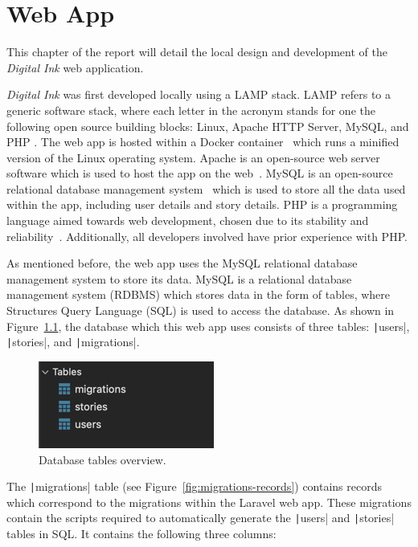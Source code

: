 \chapter{Web App}\label{ch:web-app}

This chapter of the report will detail the local design and development of the \textit{Digital Ink} web application.

\textit{Digital Ink} was first developed locally using a LAMP stack.
LAMP refers to a generic software stack, where each letter in the acronym stands for one the following open source building blocks: Linux, Apache HTTP Server, MySQL, and PHP \citep{lee2003open}.
The web app is hosted within a Docker container~\citep{anderson2015docker} which runs a minified version of the Linux operating system.
Apache is an open-source web server software which is used to host the app on the web~\citep{fielding1997apache}.
MySQL is an open-source relational database management system~\citep{widenius2002mysql} which is used to store all the data used within the app, including user details and story details.
PHP is a programming language aimed towards web development, chosen due to its stability and reliability~\citep{lerdorf2002programming}.
Additionally, all developers involved have prior experience with PHP\@.

As mentioned before, the web app uses the MySQL relational database management system to store its data.
MySQL is a relational database management system (RDBMS) which stores data in the form of tables, where Structures Query Language (SQL) is used to access the database.
As shown in Figure~\ref{fig:tables-overview}, the database which this web app uses consists of three tables: \texttt|users|, \texttt|stories|, and \texttt|migrations|.

\begin{figure}[!htbp]
    \centering
    \includegraphics[scale=1]{resources/database/tables-overview}
    \caption{Database tables overview.}
    \label{fig:tables-overview}
\end{figure}

The \texttt|migrations| table (see Figure~\ref{fig:migrations-records}) contains records which correspond to the migrations within the Laravel web app.
These migrations contain the scripts required to automatically generate the \texttt|users| and \texttt|stories| tables in SQL\@.
It contains the following three columns:

